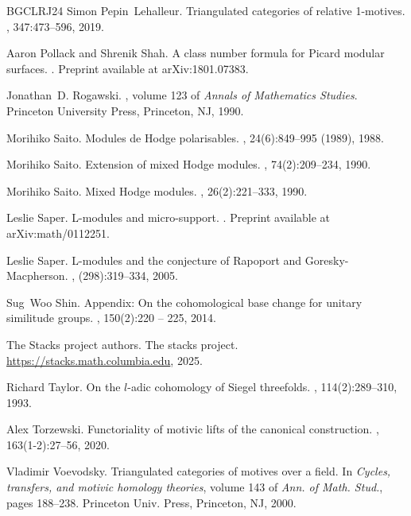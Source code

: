 \documentclass[11pt, a4paper]{amsart}
\theoremstyle{plain}
\theoremstyle{definition}
\numberwithin{equation}{section}
\begin{document}
\begin{thebibliography}{BGCLRJ24}
Simon Pepin~Lehalleur.
\newblock Triangulated categories of relative 1-motives.
, 347:473--596, 2019.

Aaron Pollack and Shrenik Shah.
\newblock A class number formula for {P}icard modular surfaces.
.
\newblock Preprint available at arXiv:1801.07383.

Jonathan~D. Rogawski.
, volume 123 of {\em Annals of Mathematics Studies}.
\newblock Princeton University Press, Princeton, NJ, 1990.

Morihiko Saito.
\newblock Modules de {H}odge polarisables.
, 24(6):849--995 (1989), 1988.

Morihiko Saito.
\newblock Extension of mixed {H}odge modules.
, 74(2):209--234, 1990.

Morihiko Saito.
\newblock Mixed {H}odge modules.
, 26(2):221--333, 1990.

Leslie Saper.
\newblock L-modules and micro-support.
.
\newblock Preprint available at arXiv:math/0112251.

Leslie Saper.
\newblock L-modules and the conjecture of {R}apoport and
  {G}oresky-{M}acpherson.
, (298):319--334, 2005.

Sug~Woo Shin.
\newblock Appendix: On the cohomological base change for unitary similitude
  groups.
, 150(2):220 -- 225, 2014.

The {Stacks project authors}.
\newblock The stacks project.
\newblock \url{https://stacks.math.columbia.edu}, 2025.

Richard Taylor.
\newblock On the {$l$}-adic cohomology of {S}iegel threefolds.
, 114(2):289--310, 1993.

Alex Torzewski.
\newblock Functoriality of motivic lifts of the canonical construction.
, 163(1-2):27--56, 2020.

Vladimir Voevodsky.
\newblock Triangulated categories of motives over a field.
\newblock In {\em Cycles, transfers, and motivic homology theories}, volume 143
  of {\em Ann. of Math. Stud.}, pages 188--238. Princeton Univ. Press,
  Princeton, NJ, 2000.


\end{thebibliography}
\end{document}
